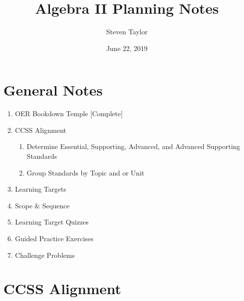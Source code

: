\documentclass{article}
\title{Algebra II Planning Notes}
\author{Steven Taylor}
\date{June 22, 2019}
\begin{document}
\maketitle
\section*{General Notes}
\begin{enumerate}
    \item OER Bookdown Temple [Complete]
    \item CCSS Alignment
    \begin{enumerate}
    	\item Determine Essential, Supporting, Advanced, and Advanced Supporting Standards
    	\item Group Standards by Topic and or Unit
    \end{enumerate}
    \item Learning Targets
    \item Scope \& Sequence
    \item Learning Target Quizzes
    \item Guided Practice Exercises
    \item Challenge Problems
\end{enumerate}
\section*{CCSS Alignment}
\end{document}
